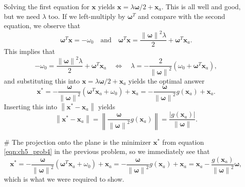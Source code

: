 \documentclass[12pt, a4paper]{article}
\newcommand{\vect}[1]{\bm{#1}}
\newcommand{\norm}[1]{\left\lVert#1\right\rVert}
\newcommand{\abs}[1]{\left\lvert#1\right\rvert}
\begin{document}
\begin{easylist}[enumerate]
	Solving the first equation for $\vect{x}$ yields $\vect{x} = \lambda \vect{\omega} / 2 + \vect{x}_a$.
	This is all well and good, but we need $\lambda$ too.
	If we left-multiply by $\vect{\omega}^T$ and compare with the second equation, we observe that
	\begin{equation*}
		\vect{\omega}^T \vect{x} 
		= -\omega_0 \quad \text{and} 
		\quad 
		\vect{\omega}^T \vect{x} 
		= 
		\frac{\norm{\vect{\omega}}^2 \lambda}{2} + \vect{\omega}^T \vect{x}_a.
	\end{equation*}
	This implies that
	\begin{equation*}
		-\omega_0 =  \frac{\norm{\vect{\omega}}^2 \lambda}{2} + \vect{\omega}^T \vect{x}_a \quad \Leftrightarrow \quad \lambda = - \frac{2}{\norm{\vect{\omega}}^2}\left( \omega_0 + \vect{\omega}^T \vect{x}_a \right),
	\end{equation*}
	and substituting this into $\vect{x} = \lambda \vect{\omega} / 2 + \vect{x}_a$ yields the optimal answer
	\begin{equation}
	\label{eqn:ch5_prob4}
		\vect{x}^* = -\frac{\vect{\omega}}{\norm{\vect{\omega}}^2} \left( \vect{\omega}^T \vect{x}_a + \omega_0 \right) + \vect{x}_a = - \frac{\vect{\omega}}{\norm{\vect{\omega}}^2} g(\vect{x}_a) + \vect{x}_a.
	\end{equation}
	Inserting this into $\norm{\vect{x}^* - \vect{x}_a}$ yields 
	\begin{equation*}
		\norm{\vect{x}^* - \vect{x}_a}=
		\norm{\frac{\vect{\omega}}{\norm{\vect{\omega}}^2} g(\vect{x}_a)}
		= \frac{\abs{g(\vect{x}_a)}}{\norm{\vect{\omega}}}.
	\end{equation*}
	
	# The projection onto the plane is the minimizer $\vect{x}^*$ from equation \eqref{eqn:ch5_prob4} in the previous problem, so we immediately see that 
	\begin{equation*}
	\vect{x}^* = -\frac{\vect{\omega}}{\norm{\vect{\omega}}^2} \left( \vect{\omega}^T \vect{x}_a + \omega_0 \right) + \vect{x}_a = - \frac{\vect{\omega}}{\norm{\vect{\omega}}^2} g(\vect{x}_a) + \vect{x}_a
	=  
	\vect{x}_a - \frac{g(\vect{x}_a)}{\norm{\vect{\omega}}^2}  \vect{\omega},
	\end{equation*}
	which is what we were required to show.
\end{easylist}
\end{document}
